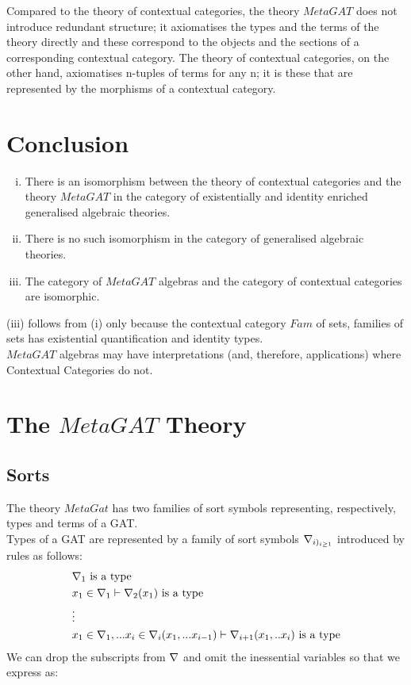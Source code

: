 \documentclass[10pt,a4paper]{article}
\begin{document}
Compared to the theory of contextual categories, the theory $MetaGAT$ does not introduce redundant structure; it axiomatises the types and the terms of the theory directly and these correspond to the objects and the sections of a corresponding contextual category. The theory of contextual categories, on the other hand, axiomatises n-tuples of terms for any n; it is  these that are represented by the morphisms of a contextual category.  

\section{Conclusion}

\begin{enumerate}[(i)]
\item There is an isomorphism between the theory of contextual categories and the theory $MetaGAT$ in the category of existentially and identity enriched generalised algebraic theories. 
\item There is no such isomorphism in the category of generalised algebraic theories.
\item The category of $MetaGAT$ algebras and the category of contextual categories are isomorphic. 
\end{enumerate}

\noindent (iii) follows from (i) only because the contextual category $Fam$ of sets, families of sets has existential quantification and identity types. \\

\noindent $MetaGAT$ algebras may have interpretations (and, therefore, applications) where Contextual Categories do not.

\section{The $MetaGAT$ Theory}

\subsection*{Sorts}
The theory $MetaGat$ has two families of sort symbols representing, respectively,  types and terms of a GAT. \\

\noindent Types of a GAT are represented by a family of sort symbols $\nabla_{i)_{i\geq 1}}$ introduced by rules as follows: 
\begin{align*}
&\nabla_1\mbox{ is a type} \\
&x_1 \in \nabla_1 \vdash \nabla_2(x_1)\mbox{ is a type} \\
& \vdots \\
&x_1 \in \nabla_1,... x_{i} \in \nabla_{i}(x_1,...x_{i-1}) \vdash \nabla_{i+1}(x_1, ..x_{i})\mbox{ is a type} \\
\end{align*}
\noindent We can drop the subscripts from $\nabla$ and omit the inessential variables so that we express as:
\end{document}
